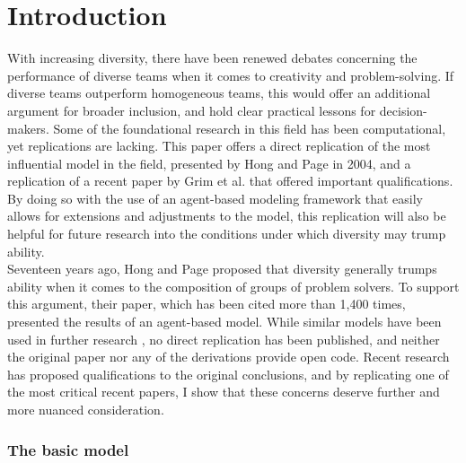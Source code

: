 
\section{Introduction}

With increasing diversity, there have been renewed debates concerning the performance of diverse teams when it comes to creativity and problem-solving. If diverse teams outperform homogeneous teams, this would offer an additional argument for broader inclusion, and hold clear practical lessons for decision-makers. Some of the foundational research in this field has been computational, yet replications are lacking. This paper offers a direct replication of the most influential model in the field, presented by Hong and Page in 2004\supercite{hong_groups_2004}, and a replication of a recent paper by Grim et al.\supercite{grim_diversity_2019} that offered important qualifications. By doing so with the use of an agent-based modeling framework that easily allows for extensions and adjustments to the model, this replication will also be helpful for future research into the conditions under which diversity may trump ability. \\

Seventeen years ago, Hong and Page\supercite{hong_groups_2004} proposed that diversity generally trumps ability when it comes to the composition of groups of problem solvers. To support this argument, their paper, which has been cited more than 1,400 times, presented the results of an agent-based model. While similar models have been used in further research \supercite{singer2019diversity, grim_diversity_2019, holman2018diversity}, no direct replication has been published, and neither the original paper nor any of the derivations provide open code. Recent research has proposed qualifications to the original conclusions, and by replicating one of the most critical recent papers\supercite{grim_diversity_2019}, I show that these concerns deserve further and more nuanced consideration.  

\subsubsection{The basic model}

